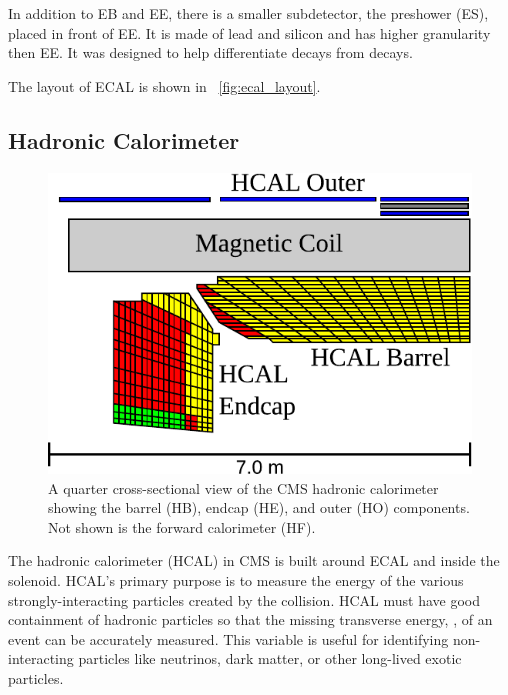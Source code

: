 In addition to EB and EE, there is a smaller subdetector, the preshower (ES),
placed in front of EE. It is made of lead and silicon and has higher
granularity then EE. It was designed to help differentiate \pitogammagamma
decays from \higgstogammagamma decays.

The layout of ECAL is shown in \FIG~\ref{fig:ecal_layout}.

\subsection{Hadronic Calorimeter}
\label{ssec:hcal}

\begin{figure}[!htbp]
    \centering
    \includegraphics[width=\textwidth]{figures/hcal_cross_section.pdf}
    \caption[
        A quarter cross-sectional view of the CMS hadronic calorimeter.
    ]{
        A quarter cross-sectional view of the CMS hadronic calorimeter showing
        the barrel (HB), endcap (HE), and outer (HO) components. Not shown is
        the forward calorimeter (HF).
    }
    \label{fig:hcal_layout}
\end{figure}

The hadronic calorimeter (HCAL) in CMS is built around ECAL and inside the
solenoid. HCAL's primary purpose is to measure the energy of the various
strongly-interacting particles created by the collision. HCAL must have good
containment of hadronic particles so that the missing transverse energy, \MET,
of an event can be accurately measured. This variable is useful for identifying
non-interacting particles like neutrinos, dark matter, or other long-lived
exotic particles.

